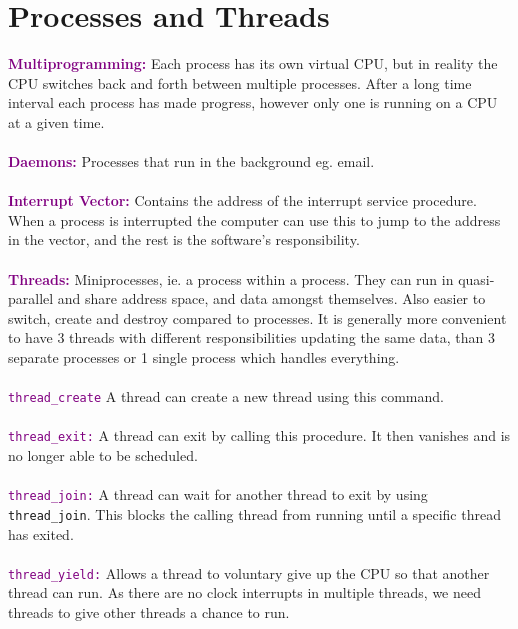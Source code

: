 \documentclass[a4paper,10pt]{article}
\begin{document}
\section{Processes and Threads}
\textcolor{Purple}{\textbf{Multiprogramming:}} Each process has its own virtual CPU, but in reality the CPU switches back and forth between multiple processes. After a long time interval each process has made progress, however only one is running on a CPU at a given time. \\\\
\textcolor{Purple}{\textbf{Daemons:}} Processes that run in the background eg. email. \\\\
\textcolor{Purple}{\textbf{Interrupt Vector:}} Contains the address of the interrupt service procedure. When a process is interrupted the computer can use this to jump to the address in the vector, and the rest is the software's responsibility. \\\\
\textcolor{Purple}{\textbf{Threads:}} Miniprocesses, ie. a process within a process. They can run in quasi-parallel and share address space, and data amongst themselves. Also easier to switch, create and destroy compared to processes. It is generally more convenient to have 3 threads with different responsibilities updating the same data, than 3 separate processes or 1 single process which handles everything. \\\\
\textcolor{Purple}{\texttt{thread\_create}} A thread can create a new thread using this command. \\\\
\textcolor{Purple}{\texttt{thread\_exit:}} A thread can exit by calling this procedure. It then vanishes and is no longer able to be scheduled. \\\\
\textcolor{Purple}{\texttt{thread\_join:}} A thread can wait for another thread to exit by using \texttt{thread\_join}. This blocks the calling thread from running until a specific thread has exited. \\\\
\textcolor{Purple}{\texttt{thread\_yield:}} Allows a thread to voluntary give up the CPU so that another thread can run. As there are no clock interrupts in multiple threads, we need threads to give other threads a chance to run.
\end{document}
